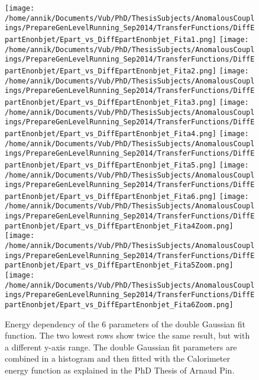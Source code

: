 \begin{figure}[!h]
  \centering
  \texttt{[image: /home/annik/Documents/Vub/PhD/ThesisSubjects/AnomalousCouplings/PrepareGenLevelRunning\_Sep2014/TransferFunctions/DiffEpartEnonbjet/Epart\_vs\_DiffEpartEnonbjet\_Fita1.png]}
  \texttt{[image: /home/annik/Documents/Vub/PhD/ThesisSubjects/AnomalousCouplings/PrepareGenLevelRunning\_Sep2014/TransferFunctions/DiffEpartEnonbjet/Epart\_vs\_DiffEpartEnonbjet\_Fita2.png]}
  \texttt{[image: /home/annik/Documents/Vub/PhD/ThesisSubjects/AnomalousCouplings/PrepareGenLevelRunning\_Sep2014/TransferFunctions/DiffEpartEnonbjet/Epart\_vs\_DiffEpartEnonbjet\_Fita3.png]}
  \texttt{[image: /home/annik/Documents/Vub/PhD/ThesisSubjects/AnomalousCouplings/PrepareGenLevelRunning\_Sep2014/TransferFunctions/DiffEpartEnonbjet/Epart\_vs\_DiffEpartEnonbjet\_Fita4.png]}
  \texttt{[image: /home/annik/Documents/Vub/PhD/ThesisSubjects/AnomalousCouplings/PrepareGenLevelRunning\_Sep2014/TransferFunctions/DiffEpartEnonbjet/Epart\_vs\_DiffEpartEnonbjet\_Fita5.png]}
  \texttt{[image: /home/annik/Documents/Vub/PhD/ThesisSubjects/AnomalousCouplings/PrepareGenLevelRunning\_Sep2014/TransferFunctions/DiffEpartEnonbjet/Epart\_vs\_DiffEpartEnonbjet\_Fita6.png]}
  \texttt{[image: /home/annik/Documents/Vub/PhD/ThesisSubjects/AnomalousCouplings/PrepareGenLevelRunning\_Sep2014/TransferFunctions/DiffEpartEnonbjet/Epart\_vs\_DiffEpartEnonbjet\_Fita4Zoom.png]}
  \texttt{[image: /home/annik/Documents/Vub/PhD/ThesisSubjects/AnomalousCouplings/PrepareGenLevelRunning\_Sep2014/TransferFunctions/DiffEpartEnonbjet/Epart\_vs\_DiffEpartEnonbjet\_Fita5Zoom.png]}
  \texttt{[image: /home/annik/Documents/Vub/PhD/ThesisSubjects/AnomalousCouplings/PrepareGenLevelRunning\_Sep2014/TransferFunctions/DiffEpartEnonbjet/Epart\_vs\_DiffEpartEnonbjet\_Fita6Zoom.png]}
  \caption{Energy dependency of the 6 parameters of the double Gaussian fit function. The two lowest rows show twice the same result, but with a different y-axis range. The double Gaussian fit parameters are combined in a histogram and then fitted with the Calorimeter energy function as explained in the PhD Thesis of Arnaud Pin.}
\end{figure}

